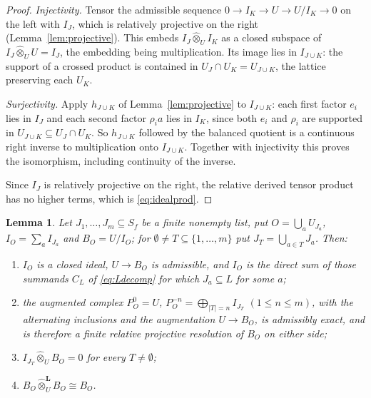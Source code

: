 \documentclass[11pt]{amsart}
\newtheorem{lemma}[theorem]{Lemma}
\theoremstyle{definition}
\theoremstyle{remark}
\begin{document}
\begin{proof}
\emph{Injectivity.}  Tensor the admissible sequence $0\to I_K\to U\to U/I_K\to0$
on the left with $I_J$, which is relatively projective on the right
(Lemma~\ref{lem:projective}).  This embeds $I_J\widehat\otimes_UI_K$ as a
closed subspace of $I_J\widehat\otimes_UU=I_J$, the embedding being
multiplication.  Its image lies in $I_{J\cup K}$: the support of a crossed
product is contained in $U_J\cap U_K=U_{J\cup K}$, the lattice preserving each
$U_K$.

\emph{Surjectivity.}  Apply $h_{J\cup K}$ of Lemma~\ref{lem:projective} to
$I_{J\cup K}$: each first factor $e_i$ lies in $I_J$ and each second factor
$\rho_ia$ lies in $I_K$, since both $e_i$ and $\rho_i$ are supported in
$U_{J\cup K}\subseteq U_J\cap U_K$.  So $h_{J\cup K}$ followed by the balanced
quotient is a continuous right inverse to multiplication onto $I_{J\cup K}$.
Together with injectivity this proves the isomorphism, including continuity of
the inverse.

Since $I_J$ is relatively projective on the right, the relative derived tensor
product has no higher terms, which is \eqref{eq:idealprod}.
\end{proof}

\begin{lemma}\label{lem:cech}
Let $J_1,\dots,J_m\subseteq S_f$ be a finite nonempty list, put
$O=\bigcup_{a}U_{J_a}$, $I_O=\sum_aI_{J_a}$ and $B_O=U/I_O$; for
$\emptyset\ne T\subseteq\{1,\dots,m\}$ put $J_T=\bigcup_{a\in T}J_a$.  Then:
\begin{enumerate}
\item[(i)] $I_O$ is a closed ideal, $U\to B_O$ is admissible, and $I_O$ is the
direct sum of those summands $C_L$ of \eqref{eq:Ldecomp} for which
$J_a\subseteq L$ for some $a$;
\item[(ii)] the augmented complex
$P_O^{0}=U$, $P_O^{-n}=\bigoplus_{|T|=n}I_{J_T}$ $(1\le n\le m)$, with the
alternating inclusions and the augmentation $U\to B_O$, is admissibly exact,
and is therefore a finite relative projective resolution of $B_O$ on either
side;
\item[(iii)] $I_{J_T}\widehat\otimes_UB_O=0$ for every $T\ne\emptyset$;
\item[(iv)] $B_O\widehat\otimes^{\mathbf L}_UB_O\cong B_O$.
\end{enumerate}
\end{lemma}
\end{document}
